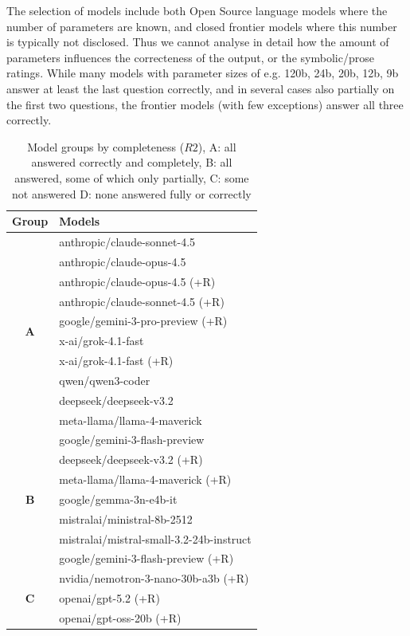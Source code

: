 The selection of models include both Open Source language models where the number of parameters are known, and closed frontier models where this number
is typically not disclosed. Thus we cannot analyse in detail how the amount of parameters influences the correcteness of the output, or the symbolic/prose ratings.
While many models with parameter sizes of e.g. 120b, 24b, 20b, 12b, 9b answer at least the last question correctly, and in several cases also partially on the first two questions,
the frontier models (with few exceptions) answer all three correctly. 

\begin{table}[h]
\centering
\caption{Model groups by completeness ($R2$), A: all answered correctly and completely, B: all answered, some of which only partially, C: some not answered D: none answered fully or correctly }
\label{tab:groups}
\begin{tabular}{cl}
\hline
\textbf{Group} & \textbf{Models} \\
\hline
\multirow{10}{*}{\textbf{A}} 
  & anthropic/claude-sonnet-4.5 \\
  & anthropic/claude-opus-4.5 \\
  & anthropic/claude-opus-4.5 (+R) \\
  & anthropic/claude-sonnet-4.5 (+R) \\
  & google/gemini-3-pro-preview (+R) \\
  & x-ai/grok-4.1-fast \\
  & x-ai/grok-4.1-fast (+R) \\
  & qwen/qwen3-coder \\
  & deepseek/deepseek-v3.2 \\
  & meta-llama/llama-4-maverick \\
\hline
\multirow{7}{*}{\textbf{B}}
  & google/gemini-3-flash-preview \\
  & deepseek/deepseek-v3.2 (+R) \\
  & meta-llama/llama-4-maverick (+R) \\
  & google/gemma-3n-e4b-it \\
  & mistralai/ministral-8b-2512 \\
  & mistralai/mistral-small-3.2-24b-instruct \\
  & google/gemini-3-flash-preview (+R) \\
\hline
\multirow{13}{*}{\textbf{C}}
  & nvidia/nemotron-3-nano-30b-a3b (+R) \\
  & openai/gpt-5.2 (+R) \\
  & openai/gpt-oss-20b (+R) \\

\end{tabular}
\end{table}
